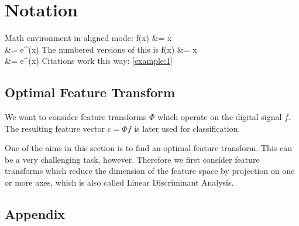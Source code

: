 \documentclass[oneside,a4paper]{article}
\title{\TITEL}
\author{Fin, Stan, Stefan, Jakob, Roland }
\begin{document}
\maketitle
\thispagestyle{empty}
\newpage
\tableofcontents
\thispagestyle{empty}
\newpage
\setcounter{page}{1}

\chapter{Notation}

Math environment in aligned mode:
\ba
f(x) &= x \\
	 &= e^{\log(x)}
\ea The numbered versions of this is
\ban
\label{example:1}
f(x) &= x \nonumber \\
	 &= e^{\log(x)}
\ean
Citations work this way: \eqref{example:1}



%
	\section{Optimal Feature Transform}
	\label{OFT}
	We want to consider feature transforms $\Phi$ which operate on the digital signal $f$. The resulting feature vector $c = \Phi f$ is later used for classification.
	
	One of the aims in this section is to find an optimal feature transform. This can be a very challenging task, however. 
	Therefore we first consider feature transforms which reduce the dimension of the feature space by projection on one or more axes, which is also called Linear Discriminant Analysis.
		\label{LDA}
		

%
%
%
\newpage

\appendix
{}
\section{Appendix}
\label{Appendix}

\newpage
\end{document}
